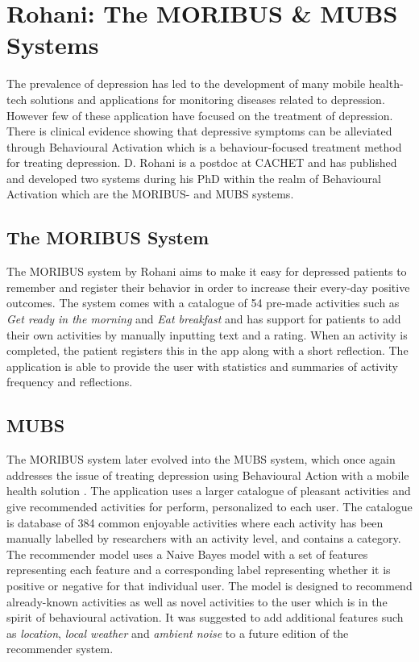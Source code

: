 \section{Rohani: The MORIBUS \& MUBS Systems}
The prevalence of depression has led to the development of many mobile health-tech solutions and applications for monitoring diseases related to depression. However few of these application have focused on the treatment of depression. There is clinical evidence showing that depressive symptoms can be alleviated through Behavioural Activation which is a behaviour-focused treatment method for treating depression. D. Rohani is a postdoc at CACHET and has published and developed two systems during his PhD within the realm of Behavioural Activation which are the MORIBUS- and MUBS systems.

\subsection{The MORIBUS System}
The MORIBUS system \cite{moribus} by Rohani aims to make it easy for depressed patients to remember and register their behavior in order to increase their every-day positive outcomes. The system comes with a catalogue of 54 pre-made activities such as \textit{Get ready in the morning} and \textit{Eat breakfast} and has support for patients to add their own activities by manually inputting text and a rating. When an activity is completed, the patient registers this in the app along with a short reflection. The application   is able to provide the user with statistics and summaries of activity frequency and reflections.

\subsection{MUBS}
The MORIBUS system later evolved into the MUBS system, which once again addresses the issue of treating depression using Behavioural Action with a mobile health solution \cite{mubs-rohani}. The application uses a larger catalogue of pleasant activities and give recommended activities for perform, personalized to each user. The catalogue is database of 384 common enjoyable activities where each activity has been manually labelled by researchers with an activity level, and contains a category. The recommender model uses a Naive Bayes model with a set of features representing each feature and a corresponding label representing whether it is positive or negative for that individual user. The model is designed to recommend already-known activities as well as novel activities to the user which is in the spirit of behavioural activation. It was suggested to add additional features such as \textit{location}, \textit{local weather} and \textit{ambient noise} to a future edition of the recommender system. 

